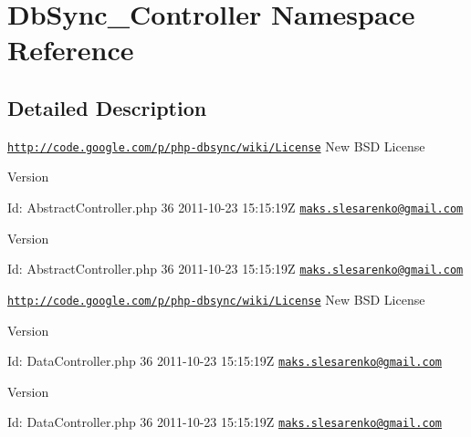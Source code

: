 \hypertarget{namespaceDbSync__Controller}{
\section{DbSync\_\-Controller Namespace Reference}
\label{namespaceDbSync__Controller}
}


\subsection{Detailed Description}
\href{http://code.google.com/p/php-dbsync/wiki/License}{\tt http://code.google.com/p/php-\/dbsync/wiki/License} New BSD License \begin{DoxyVersion}{Version}

\end{DoxyVersion}
\begin{DoxyParagraph}{Id:}
AbstractController.php 36 2011-\/10-\/23 15:15:19Z \href{mailto:maks.slesarenko@gmail.com}{\tt maks.slesarenko@gmail.com} 
\end{DoxyParagraph}


\begin{DoxyVersion}{Version}

\end{DoxyVersion}
\begin{DoxyParagraph}{Id:}
AbstractController.php 36 2011-\/10-\/23 15:15:19Z \href{mailto:maks.slesarenko@gmail.com}{\tt maks.slesarenko@gmail.com} 
\end{DoxyParagraph}


\href{http://code.google.com/p/php-dbsync/wiki/License}{\tt http://code.google.com/p/php-\/dbsync/wiki/License} New BSD License \begin{DoxyVersion}{Version}

\end{DoxyVersion}
\begin{DoxyParagraph}{Id:}
DataController.php 36 2011-\/10-\/23 15:15:19Z \href{mailto:maks.slesarenko@gmail.com}{\tt maks.slesarenko@gmail.com} 
\end{DoxyParagraph}


\begin{DoxyVersion}{Version}

\end{DoxyVersion}
\begin{DoxyParagraph}{Id:}
DataController.php 36 2011-\/10-\/23 15:15:19Z \href{mailto:maks.slesarenko@gmail.com}{\tt maks.slesarenko@gmail.com} 
\end{DoxyParagraph}


